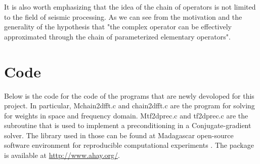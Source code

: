 It is also worth emphasizing that the idea of the chain of operators is not limited to the field of seismic processing. As we can see from the motivation and the generality of the hypothesis that "the complex operator can be effectively approximated through the chain of parameterized elementary operators".

\appendix
\section{Code}
Below is the code for the code of the programs that are newly devoloped for this project. In particular, Mchain2dfft.c and chain2dfft.c are the program for solving for weights in space and frequency domain. Mtf2dprec.c and tf2dprec.c are the subroutine that is used to implement a preconditioning in a Conjugate-gradient solver. The library used in those can be found at Madagascar open-source software environment for reproducible computational experiments \cite[]{madagascar}. The package is available at \url{http://www.ahay.org/}.


